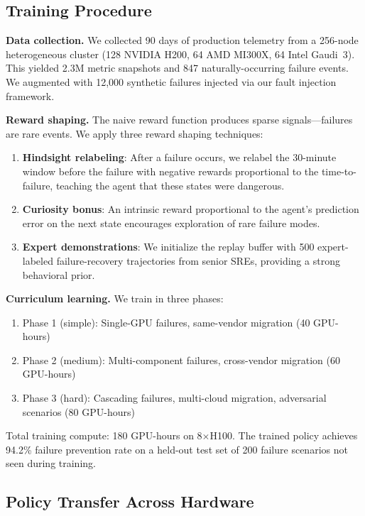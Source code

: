 \documentclass[conference,10pt,letterpaper]{IEEEtran}
\begin{document}
\subsection{Training Procedure}

\textbf{Data collection.} We collected 90 days of production telemetry from a 256-node heterogeneous cluster (128 NVIDIA H200, 64 AMD MI300X, 64 Intel Gaudi~3). This yielded 2.3M metric snapshots and 847 naturally-occurring failure events. We augmented with 12,000 synthetic failures injected via our fault injection framework.

\textbf{Reward shaping.} The naive reward function produces sparse signals---failures are rare events. We apply three reward shaping techniques:
\begin{enumerate}
\item \textbf{Hindsight relabeling}: After a failure occurs, we relabel the 30-minute window before the failure with negative rewards proportional to the time-to-failure, teaching the agent that these states were dangerous.
\item \textbf{Curiosity bonus}: An intrinsic reward proportional to the agent's prediction error on the next state encourages exploration of rare failure modes.
\item \textbf{Expert demonstrations}: We initialize the replay buffer with 500 expert-labeled failure-recovery trajectories from senior SREs, providing a strong behavioral prior.
\end{enumerate}

\textbf{Curriculum learning.} We train in three phases:
\begin{enumerate}
\item Phase 1 (simple): Single-GPU failures, same-vendor migration (40 GPU-hours)
\item Phase 2 (medium): Multi-component failures, cross-vendor migration (60 GPU-hours)
\item Phase 3 (hard): Cascading failures, multi-cloud migration, adversarial scenarios (80 GPU-hours)
\end{enumerate}

Total training compute: 180 GPU-hours on 8$\times$H100. The trained policy achieves 94.2\% failure prevention rate on a held-out test set of 200 failure scenarios not seen during training.

\subsection{Policy Transfer Across Hardware}
\end{document}
